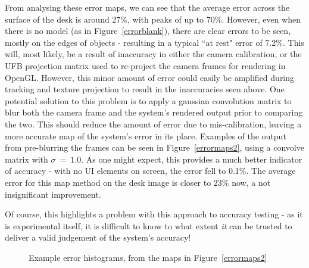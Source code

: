 \documentclass[a4paper,10pt]{report}
\begin{document}
From analysing these error maps, we can see that the average error across the surface of the desk is around 27\%, with peaks of up to 70\%. However, even when there is no model (as in Figure~\ref{errorblank}), there are clear errors to be seen, mostly on the edges of objects - resulting in a typical ``at rest" error of 7.2\%. This will, most likely, be a result of inaccuracy in either the camera calibration, or the UFB projection matrix used to re-project the camera frames for rendering in OpenGL. However, this minor amount of error could easily be amplified during tracking and texture projection to result in the inaccuracies seen above. One potential solution to this problem is to apply a gaussian convolution matrix to blur both the camera frame and the system's rendered output prior to comparing the two. This should reduce the amount of error due to mis-calibration, leaving a more accurate map of the system's error in its place. Examples of the output from pre-blurring the frames can be seen in Figure~\ref{errormaps2}, using a convolve matrix with $\sigma ~=~ 1.0$. As one might expect, this provides a much better indicator of accuracy - with no UI elements on screen, the error fell to 0.1\%. The average error for this map method on the desk image is closer to 23\% now, a not insignificant improvement.

Of course, this highlights a problem with this approach to accuracy testing - as it is experimental itself, it is difficult to know to what extent \textit{it} can be trusted to deliver a valid judgement of the system's accuracy!

\begin{figure}
  \begin{center}
    \hspace{10px}
  \end{center}
  \caption{Example error histograms, from the maps in Figure~\ref{errormaps2}}
  \label{histograms}
\end{figure} 
\end{document}

